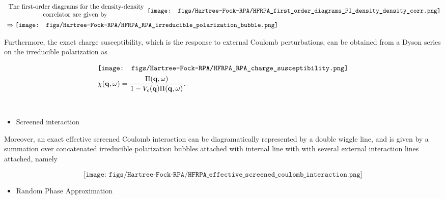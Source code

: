 \begin{equation}
\begin{split}
    & \begin{array}{cc}
         \textnormal{The first-order diagrams for the density-density}  \\
         \textnormal{correlator are given by }
    \end{array}
    \texttt{[image: figs/Hartree-Fock-RPA/HFRPA\_first\_order\_diagrams\_PI\_density\_density\_corr.png]}\\
    & \Rightarrow \texttt{[image: figs/Hartree-Fock-RPA/HFRPA\_RPA\_irreducible\_polarization\_bubble.png]}
\end{split}
\label{HFRPA_first_order_density_density_corr_diagrams}
\end{equation}

Furthermore, the exact charge susceptibility, which is the response to external Coulomb perturbations, can be obtained from a Dyson series on the irreducible polarization as 

\begin{equation}
\begin{split}
     &\texttt{[image: figs/Hartree-Fock-RPA/HFRPA\_RPA\_charge\_susceptibility.png]} \\
     & \chi({\bf q}, \omega) = \frac{\Pi({\bf q}, \omega)}{1- V_c({\bf q}) \Pi({\bf q}, \omega)}.
\end{split}
\end{equation}

\blanky \\

\begin{itemize}
    \item Screened interaction
\end{itemize}

Moreover, an exact effective screened Coulomb interaction can be diagramatically represented by a double wiggle line, and is given by a summation over concatenated irreducible polarization bubbles attached with internal line with with several external interaction lines attached, namely

\begin{equation}
    \texttt{[image: figs/Hartree-Fock-RPA/HFRPA\_effective\_screened\_coulomb\_interaction.png]}    
\end{equation}

\begin{itemize}
    \item Random Phase Approximation
\end{itemize}

